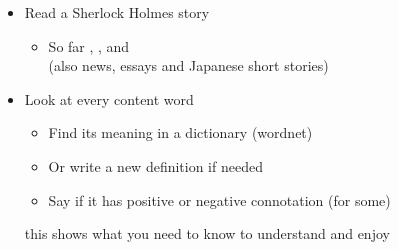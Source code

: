 \documentclass[headrule,footrule]{foils}
\begin{document}

\begin{itemize}\addtolength{\itemsep}{-1ex}
\item Read a Sherlock Holmes story
  \begin{itemize}
  \item  So far , ,  and 
\\ (also news, essays and Japanese short stories)
  \end{itemize}
\item Look at every content word
  \begin{itemize}
  \item Find its meaning in a dictionary (wordnet)
  \item Or write a new definition if needed
  \item Say if it has positive or negative connotation (for some)
  \end{itemize}
  this shows what you need to know to understand and enjoy
\end{itemize}



\end{document}

